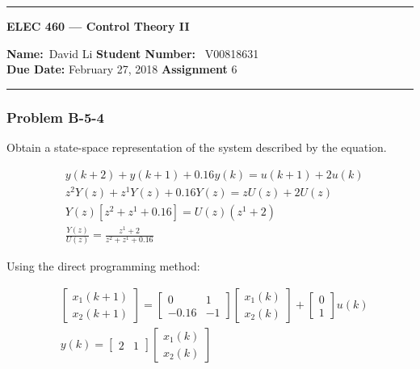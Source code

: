 \begin{center}
	\hrule
	\vspace{.4cm}
	{\textbf { \large ELEC 460 --- Control Theory II}}
\end{center}
{\textbf{Name:}\ David Li \hspace{\fill} \textbf{Student Number:} \ V00818631  \\}
{\textbf{Due Date:} February 27, 2018 \hspace{\fill} \textbf{Assignment}  6}\\
\hrule
\subsubsection*{Problem B-5-4}
Obtain a state-space representation of the system described by the equation.


\begin{align*}
& y(k+2)+y(k+1)+0.16 y(k) = u (k+1) + 2u(k) \\
& z^{2}Y(z)+z^{1}Y(z)+0.16Y(z) = zU(z)+2U(z) \\
& Y(z) [z^{2}+z^{1}+0.16] = U(z) (z^{1}+2) \\
& \frac{Y(z)}{U(z)} = \frac{z^{1}+2}{z^{2}+z^{1}+0.16} 
\end{align*}

Using the direct programming method:

\begin{align*}
&
\begin{bmatrix}
x_1(k+1) \\
x_2(k+1)
\end{bmatrix}= \begin{bmatrix}
0     &  1 \\
-0.16 & -1
\end{bmatrix} \begin{bmatrix}
x_1(k) \\ x_2(k)
\end{bmatrix} + \begin{bmatrix}
0 \\ 1
\end{bmatrix} u(k) \\
& y(k)=\begin{bmatrix}
2 & 1 
\end{bmatrix}\begin{bmatrix}
x_1(k) \\ x_2(k) 
\end{bmatrix}
\end{align*}

